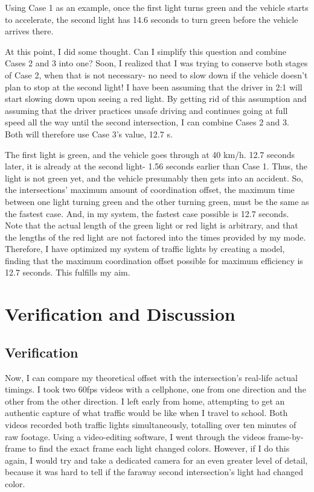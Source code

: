 \documentclass[11pt]{article}
\begin{document}
Using Case 1 as an example, once the first light turns green and the vehicle starts to accelerate, the second light has 14.6 seconds to turn green before the vehicle arrives there.

At this point, I did some thought. Can I simplify this question and combine Cases 2 and 3 into one? Soon, I realized that I was trying to conserve both stages of Case 2, when that is not necessary- no need to slow down if the vehicle doesn't plan to stop at the second light! I have been assuming that the driver in 2:1 will start slowing down upon seeing a red light. By getting rid of this assumption and assuming that the driver practices unsafe driving and continues going at full speed all the way until the second intersection, I can combine Cases 2 and 3. Both will therefore use Case 3's value, 12.7 s.

The first light is green, and the vehicle goes through at 40 km/h. 12.7 seconds later, it is already at the second light- 1.56 seconds earlier than Case 1. Thus, the light is not green yet, and the vehicle presumably then gets into an accident. So, the intersections' maximum amount of coordination offset, the maximum time between one light turning green and the other turning green, must be the same as the fastest case. And, in my system, the fastest case possible is 12.7 seconds. Note that the actual length of the green light or red light is arbitrary, and that the lengths of the red light are not factored into the times provided by my mode. Therefore, I have optimized my system of traffic lights by creating a model, finding that the maximum coordination offset possible for maximum efficiency is 12.7 seconds. This fulfills my aim.

\section{Verification and Discussion}

\subsection{Verification}

Now, I can compare my theoretical offset with the intersection's real-life actual timings. I took two 60fps videos with a cellphone, one from one direction and the other from the other direction. I left early from home, attempting to get an authentic capture of what traffic would be like when I travel to school. Both videos recorded both traffic lights simultaneously, totalling over ten minutes of raw footage. Using a video-editing software, I went through the videos frame-by-frame to find the exact frame each light changed colors. However, if I do this again, I would try and take a dedicated camera for an even greater level of detail, because it was hard to tell if the faraway second intersection's light had changed color.
\end{document}
